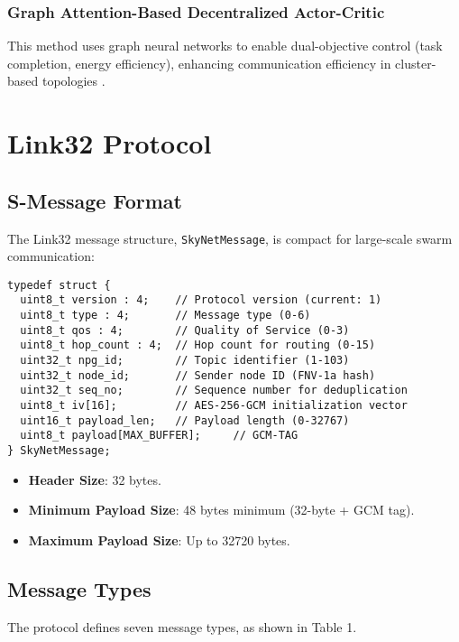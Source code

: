 \documentclass{article}
\begin{document}
\subsubsection{Graph Attention-Based Decentralized Actor-Critic}
This method uses graph neural networks to enable dual-objective control (task completion, energy efficiency), enhancing communication efficiency in cluster-based topologies \cite{Zhang2020, Wang2021}.



\section{Link32 Protocol}

\subsection{S-Message Format}
The Link32 message structure, \texttt{SkyNetMessage}, is compact for large-scale swarm
communication:
\begin{lstlisting}
typedef struct {
  uint8_t version : 4;    // Protocol version (current: 1)
  uint8_t type : 4;       // Message type (0-6)
  uint8_t qos : 4;        // Quality of Service (0-3)
  uint8_t hop_count : 4;  // Hop count for routing (0-15)
  uint32_t npg_id;        // Topic identifier (1-103)
  uint32_t node_id;       // Sender node ID (FNV-1a hash)
  uint32_t seq_no;        // Sequence number for deduplication
  uint8_t iv[16];         // AES-256-GCM initialization vector
  uint16_t payload_len;   // Payload length (0-32767)
  uint8_t payload[MAX_BUFFER];     // GCM-TAG
} SkyNetMessage;
\end{lstlisting}
\begin{itemize}
    \item \textbf{Header Size}: 32 bytes.
    \item \textbf{Minimum Payload Size}: 48 bytes minimum (32-byte + GCM tag).
    \item \textbf{Maximum Payload Size}: Up to 32720 bytes.
\end{itemize}

\newpage
\subsection{Message Types}
The protocol defines seven message types, as shown in Table 1.
\end{document}
